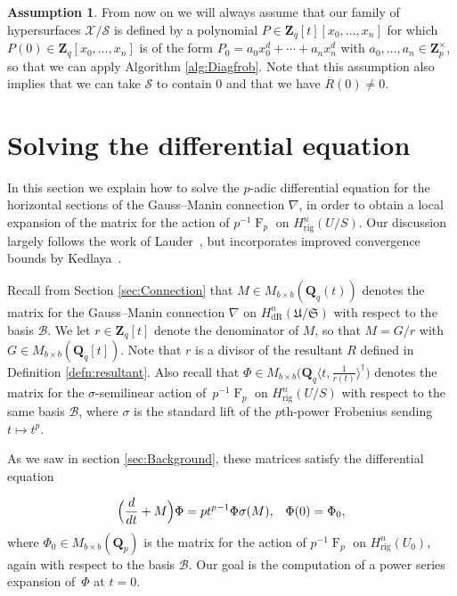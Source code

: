 \documentclass[a4paper,11pt]{article}
\numberwithin{equation}{section}
\newcommand{\ZZ}{\mathbf{Z}} %
\newcommand{\QQ}{\mathbf{Q}} %
\DeclareMathOperator{\Frob}{F}           %
\providecommand{\HdR}{H_{\text{dR}}}    %
\providecommand{\Hrig}{H_{\text{rig}}}  %
\providecommand{\cB}{\mathcal{B}} %
\theoremstyle{definition}
\newtheorem{assump}[thm]{Assumption}
\begin{document}
\begin{assump} \label{assump:diag}
From now on we will always assume that our family of hypersurfaces $\mathcal{X}/\mathcal{S}$ 
is defined by a polynomial $P \in \ZZ_q[t][x_0,\ldots,x_n]$ for which $P(0) \in \ZZ_q[x_0,\ldots,x_n]$ 
is of the form $P_0=a_0 x_0^d + \dotsb + a_n x_n^d$ with $a_0,\dotsc,a_n \in \ZZ_p^{\times}$, so that we
can apply Algorithm \ref{alg:Diagfrob}. Note that this assumption also implies that we can take $\mathcal{S}$
to contain $0$ and that we have $\overline{R}(0) \neq 0$.
\end{assump}


\section{Solving the differential equation}
\label{sec:DifferentialSystem}

In this section we explain how to solve the $p$-adic differential 
equation for the horizontal sections of the Gauss--Manin 
connection $\nabla$, in order to obtain a local expansion of the 
matrix for the action of $p^{-1} \Frob_p$ on $\Hrig^{n}(U/S)$.  
Our discussion largely follows the work of Lauder~\citep{Lauder2006}, 
but incorporates improved convergence bounds by Kedlaya~\citep{Kedlaya2010}.

Recall from Section \ref{sec:Connection} that $M \in M_{b \times b}(\QQ_q(t))$ denotes the matrix for 
the Gauss--Manin connection $\nabla$ on $\HdR^n(\mathfrak{U}/\mathfrak{S})$ with respect to the 
basis $\cB$. We let $r \in \ZZ_q[t]$ denote the denominator of $M$, so that $M = G/r$ with 
$G \in M_{b \times b}(\QQ_q[t])$. Note that $r$ is a divisor of the resultant $R$ defined in 
Definition \ref{defn:resultant}. Also recall that $\Phi \in M_{b \times b} \bigl(\QQ_q \langle t,\frac{1}{r(t)} \rangle^{\dag} \bigr)$ 
denotes the matrix for the $\sigma$-semilinear action of~$p^{-1} \Frob_p$ on $\Hrig^{n}(U/S)$ with 
respect to the same basis $\cB$, where $\sigma$ is the standard lift of the $p$th-power Frobenius 
sending $t \mapsto t^p$. 

As we saw in section \ref{sec:Background}, these matrices satisfy the differential equation

\begin{equation} \label{eq:Phi}
\Bigl(\frac{d}{dt} + M\Bigr) \Phi = p t^{p-1} \Phi \sigma(M), \; \; \; \Phi(0)=\Phi_0,
\end{equation}
where $\Phi_0 \in M_{b \times b}(\QQ_p)$ is the matrix for the action of $p^{-1} \Frob_p$ 
on $\Hrig^n(U_0)$, again with respect to the basis $\cB$. Our goal is 
the computation of a power series expansion of~$\Phi$ at $t=0$.
\end{document}
